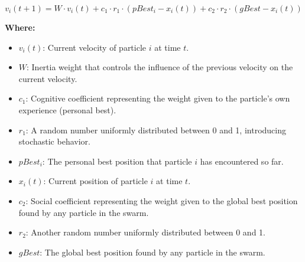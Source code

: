 
\begin{equation}
v_i(t+1) = W \cdot v_i(t) + c_1 \cdot r_1 \cdot (pBest_i - x_i(t)) + c_2 \cdot r_2 \cdot (gBest - x_i(t))
\end{equation}

\textbf{Where:}
\begin{itemize}
    \item \( v_i(t) \): Current velocity of particle \( i \) at time \( t \).
    \item \( W \): Inertia weight that controls the influence of the previous velocity on the current velocity.
    \item \( c_1 \): Cognitive coefficient representing the weight given to the particle's own experience (personal best).
    \item \( r_1 \): A random number uniformly distributed between 0 and 1, introducing stochastic behavior.
    \item \( pBest_i \): The personal best position that particle \( i \) has encountered so far.
    \item \( x_i(t) \): Current position of particle \( i \) at time \( t \).
    \item \( c_2 \): Social coefficient representing the weight given to the global best position found by any particle in the swarm.
    \item \( r_2 \): Another random number uniformly distributed between 0 and 1.
    \item \( gBest \): The global best position found by any particle in the swarm.
\end{itemize}

